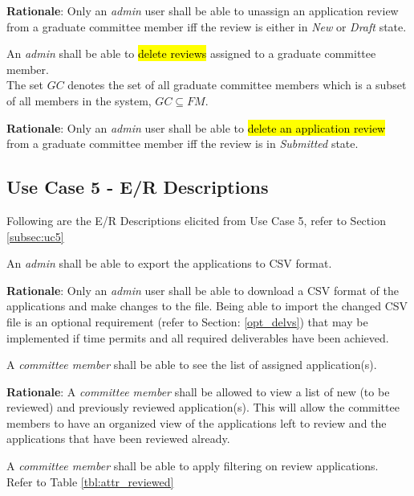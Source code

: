 \documentclass[fontsize=12pt,paper=letter,twoside]{scrartcl}
\begin{document}
\smallskip
\noindent \textbf{Rationale}: Only an \emph{admin} user shall be able to unassign an application review from a graduate committee member iff the review is either in \emph{New} or \emph{Draft} state.

\rdescription
{An \emph{admin} shall be able to \hl{delete reviews} assigned to a graduate committee member.\\}
{The set $GC$ denotes the set of all graduate committee members which is a subset of all members in the system, $GC \subseteq FM$.}

\smallskip
\noindent \textbf{Rationale}: Only an \emph{admin} user shall be able to \hl{delete an application review} from a graduate committee member iff the review is in \emph{Submitted} state.


\subsection{Use Case 5 - E/R Descriptions}

Following are the E/R Descriptions elicited from Use Case 5, refer to Section \ref{subsec:uc5}

\genreq
{An \emph{admin} shall be able to export the applications to CSV format.\\}
{}
\label{R14}

\smallskip
\noindent \textbf{Rationale}: Only an \emph{admin} user shall be able to download a CSV format of the applications and make changes to the file. Being able to import the changed CSV file is an optional requirement (refer to Section: \ref{opt_delvs}) that may be implemented if time permits and all required deliverables have been achieved.

\genreq
{A \emph{committee member} shall be able to see the list of assigned application(s).\\}
{}
\label{R15}

\smallskip
\noindent \textbf{Rationale}: A \emph{committee member} shall be allowed to view a list of new (to be reviewed) and previously reviewed application(s). This will allow the committee members to have an organized view of the applications left to review and the applications that have been reviewed already.

\rdescription
{A \emph{committee member} shall be able to apply filtering on review applications.\\}
{Refer to Table \ref{tbl:attr_reviewed}}
\label{R16}
\end{document}
